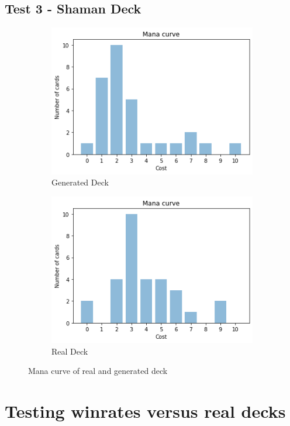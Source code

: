 \documentclass{report} %
\begin{document}
\subsection{Test 3 - Shaman Deck}
\begin{figure}[H]
\centering
\begin{subfigure}{.5\textwidth}
  \centering
  \includegraphics[width=.75\linewidth]{TestImages/ShamanDeckManaCurveFake}
  \caption{Generated Deck}
\end{subfigure}%
\begin{subfigure}{.5\textwidth}
  \centering
  \includegraphics[width=.75\linewidth]{TestImages/ShamanDeckManaCurveReal}
  \caption{Real Deck}
\end{subfigure}
\caption{Mana curve of real and generated deck}
\end{figure}
\section{Testing winrates versus real decks}
\end{document}
